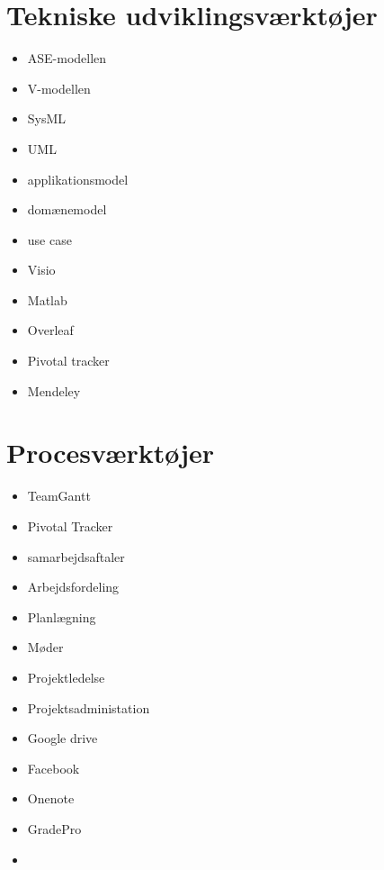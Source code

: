 




































\section*{Tekniske udviklingsværktøjer}
\begin{itemize}
\item ASE-modellen
\item V-modellen
\item SysML
\item UML
\item applikationsmodel
\item domænemodel
\item use case
\item Visio
\item Matlab
\item Overleaf
\item Pivotal tracker
\item Mendeley
\end{itemize}






\section*{Procesværktøjer}
\begin{itemize}
\item TeamGantt
\item Pivotal Tracker
\item samarbejdsaftaler
\item Arbejdsfordeling
\item Planlægning
\item Møder
\item Projektledelse
\item Projektsadministation
\item Google drive
\item Facebook
\item Onenote
\item GradePro
\item 

\end{itemize}





\cite{Aroom2009}





